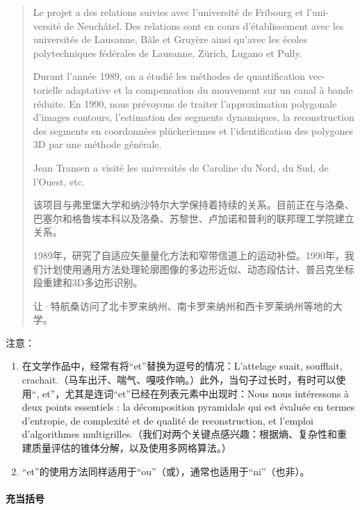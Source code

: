 \begin{quote}
    Le projet a des relations suivies avec l'université de Fribourg et l'uni- versité de Neuchâtel. Des relations sont en cours d'établissement avec les universités de Lausanne, Bâle et Gruyère ainsi qu'avec les écoles polytechniques fédérales de Lausanne, Zürich, Lugano et Pully.

    Durant l'année 1989, on a étudié les méthodes de quantification vec- torielle adaptative et la compensation du mouvement sur un canal à bande réduite. En 1990, nous prévoyons de traiter l'approximation polygonale d'images contours, l'estimation des segments dynamiques, la reconstruction des segments en coordonnées plückeriennes et l'identification des polygones 3D par une méthode générale.

    Jean Transen a visité les universités de Caroline du Nord, du Sud, de l'Ouest, etc.

    \begin{bil}
        该项目与弗里堡大学和纳沙特尔大学保持着持续的关系。目前正在与洛桑、巴塞尔和格鲁埃本科以及洛桑、苏黎世、卢加诺和普利的联邦理工学院建立关系。

        1989年，研究了自适应矢量量化方法和窄带信道上的运动补偿。1990年，我们计划使用通用方法处理轮廓图像的多边形近似、动态段估计、普吕克坐标段重建和3D多边形识别。

        让·特航桑访问了北卡罗来纳州、南卡罗来纳州和西卡罗莱纳州等地的大学。
    \end{bil}
\end{quote}

注意：

\begin{enumerate}
    \item 在文学作品中，经常有将``et''替换为逗号的情况：L'attelage suait, soufflait, crachait.（马车出汗、喘气、嘎吱作响。）此外，当句子过长时，有时可以使用``, et''，尤其是连词``et''已经在列表元素中出现时：Nous nous intéressons à deux points essentiels : la décomposition pyramidale qui est évaluée en termes d'entropie, de complexité et de qualité de reconstruction, et l'emploi d'algorithmes multigrilles.（我们对两个关键点感兴趣：根据熵、复杂性和重建质量评估的锥体分解，以及使用多网格算法。）
    \item ``et''的使用方法同样适用于``ou''（或），通常也适用于``ni''（也非）。
\end{enumerate}

\paragraph{充当括号}

